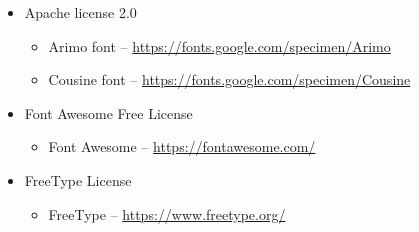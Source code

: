 \documentclass[hidelinks,titlepage,a4paper]{article}
\begin{document}
\begin{itemize}
\item Apache license 2.0
\begin{itemize}
\item Arimo font -- \url{https://fonts.google.com/specimen/Arimo}
\item Cousine font -- \url{https://fonts.google.com/specimen/Cousine}
\end{itemize}

\item Font Awesome Free License
\begin{itemize}
\item Font Awesome -- \url{https://fontawesome.com/}
\end{itemize}

\item FreeType License
\begin{itemize}
\item FreeType -- \url{https://www.freetype.org/}
\end{itemize}

\end{itemize}



\end{document}

